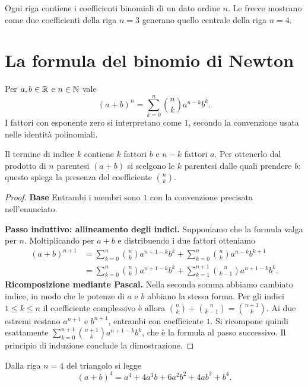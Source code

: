 \begin{schema}
\par\smallskip Ogni riga contiene i coefficienti binomiali di un dato ordine $n$. Le frecce mostrano come due coefficienti della riga $n=3$ generano quello centrale della riga $n=4$.
\end{schema}

\section{La formula del binomio di Newton}

\begin{proposizione}
Per $a,b\in\mathbb{R}$ e $n\in\mathbb{N}$ vale
\[
  (a+b)^n=\sum_{k=0}^{n}\binom nk a^{n-k}b^k.
\]
I fattori con esponente zero si interpretano come $1$, secondo la convenzione usata nelle identità polinomiali.
\end{proposizione}

Il termine di indice $k$ contiene $k$ fattori $b$ e $n-k$ fattori $a$. Per ottenerlo dal prodotto di $n$ parentesi $(a+b)$ si scelgono le $k$ parentesi dalle quali prendere $b$: questo spiega la presenza del coefficiente $\binom nk$.

\begin{proof}
\textbf{Base}\enspace{} Entrambi i membri sono $1$ con la convenzione precisata nell'enunciato.

\textbf{Passo induttivo: allineamento degli indici.} Supponiamo che la formula valga per $n$. Moltiplicando per $a+b$ e distribuendo i due fattori otteniamo
\begin{align*}
  (a+b)^{n+1}
  &=\sum_{k=0}^{n}\binom nk a^{n+1-k}b^k
    +\sum_{k=0}^{n}\binom nk a^{n-k}b^{k+1}\\
  &=\sum_{k=0}^{n}\binom nk a^{n+1-k}b^k
    +\sum_{k=1}^{n+1}\binom n{k-1}a^{n+1-k}b^k.
\end{align*}
\textbf{Ricomposizione mediante Pascal.} Nella seconda somma abbiamo cambiato indice, in modo che le potenze di $a$ e $b$ abbiano la stessa forma. Per gli indici $1\le k\le n$ il coefficiente complessivo è allora $\binom nk+\binom n{k-1}=\binom{n+1}k$. Ai due estremi restano $a^{n+1}$ e $b^{n+1}$, entrambi con coefficiente $1$. Si ricompone quindi esattamente $\sum_{k=0}^{n+1}\binom{n+1}k a^{n+1-k}b^k$, che è la formula al passo successivo. Il principio di induzione conclude la dimostrazione.
\end{proof}

\begin{esempio}
Dalla riga $n=4$ del triangolo si legge
\[
  (a+b)^4=a^4+4a^3b+6a^2b^2+4ab^3+b^4.
\]
\end{esempio}
